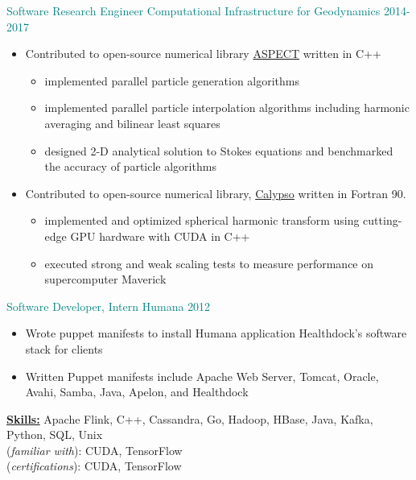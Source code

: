 \documentclass[11pt]{ltxdoc}
\begin{document}
	{\textcolor{teal}{Software Research Engineer} \hfill \textcolor{teal}{Computational Infrastructure for Geodynamics} \hfill \textcolor{teal}{2014-2017}}

      \begin{itemize}
      	
        \item Contributed to open-source numerical library \href{https://github.com/geodynamics/aspect}{ASPECT} written in C++
        
            \begin{itemize}        
            	\item implemented parallel particle generation algorithms
            	\item implemented parallel particle interpolation algorithms including harmonic averaging and bilinear least squares
            	\item designed 2-D analytical solution to Stokes equations and benchmarked the accuracy of particle algorithms
			\end{itemize}
      
		\item Contributed to open-source numerical library,
		\href{https://geodynamics.org/cig/software/calypso/}{Calypso} written in Fortran 90.
  
         	\begin{itemize}
          		\item implemented and optimized spherical harmonic transform using cutting-edge GPU hardware with CUDA in C++
          		\item executed strong and weak scaling tests to measure performance on supercomputer Maverick
          	\end{itemize}
            
	\end{itemize}
    
	\textcolor{teal}{Software Developer, Intern} \hfill \textcolor{teal}{Humana} \hfill \textcolor{teal}{2012}
		
		\begin{itemize}
			\item Wrote puppet manifests to install Humana application Healthdock's software stack for clients
			\item Written Puppet manifests include Apache Web Server, Tomcat, Oracle, Avahi, Samba, Java, Apelon, and Healthdock
		\end{itemize}
	
\textbf{\underline{Skills:}} Apache Flink, C++, Cassandra, Go, Hadoop, HBase, Java, Kafka, Python, SQL, Unix \\
(\emph{familiar with}): CUDA, TensorFlow \\
(\emph{certifications}): CUDA, TensorFlow
\end{document}
